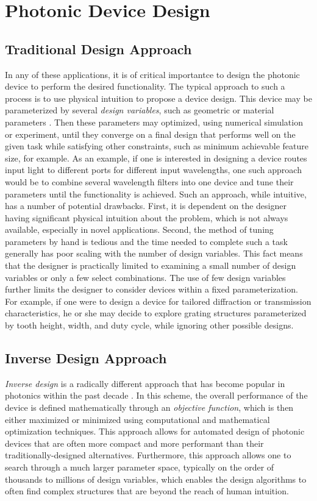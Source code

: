 \section{Photonic Device Design}

\subsection{Traditional Design Approach}

In any of these applications, it is of critical importantce to design the photonic device to perform the desired functionality.
The typical approach to such a process is to use physical intuition to propose a device design.
This device may be parameterized by several \textit{design variables}, such as geometric or material parameters \cite{hughes_plasmonic_2016}.
Then these parameters may optimized, using numerical simulation or experiment, until they converge on a final design that performs well on the given task while satisfying other constraints, such as minimum achievable feature size, for example.
As an example, if one is interested in designing a device routes input light to different ports for different input wavelengths, one such approach would be to combine several wavelength filters into one device and tune their parameters until the functionality is achieved.
Such an approach, while intuitive, has a number of potential drawbacks.
First, it is dependent on the designer having significant physical intuition about the problem, which is not always available, especially in novel applications.
Second, the method of tuning parameters by hand is tedious and the time needed to complete such a task generally has poor scaling with the number of design variables.
This fact means that the designer is practically limited to examining a small number of design variables or only a few select combinations.
The use of few design variables further limits the designer to consider devices within a fixed parameterization.
For example, if one were to design a device for tailored diffraction or transmission characteristics, he or she may decide to explore grating structures parameterized by tooth height, width, and duty cycle, while ignoring other possible designs.

\subsection{Inverse Design Approach}

\textit{Inverse design} is a radically different approach that has become popular in photonics within the past decade \cite{molesky_inverse_2018}.  
In this scheme, the overall performance of the device is defined mathematically through an \textit{objective function}, which is then either maximized or minimized using computational and mathematical optimization techniques.
This approach allows for automated design of photonic devices that are often more compact and more performant than their traditionally-designed alternatives.
Furthermore, this approach allows one to search through a much larger parameter space, typically on the order of thousands to millions of design variables, which enables the design algorithms to often find complex structures that are beyond the reach of human intuition.


